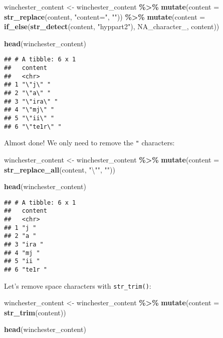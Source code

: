 \documentclass[
]{article}
\newenvironment{Shaded}{\begin{snugshade}}{\end{snugshade}}
\newcommand{\CharTok}[1]{\textcolor[rgb]{0.31,0.60,0.02}{#1}}
\newcommand{\DataTypeTok}[1]{\textcolor[rgb]{0.13,0.29,0.53}{#1}}
\newcommand{\KeywordTok}[1]{\textcolor[rgb]{0.13,0.29,0.53}{\textbf{#1}}}
\newcommand{\NormalTok}[1]{#1}
\newcommand{\OperatorTok}[1]{\textcolor[rgb]{0.81,0.36,0.00}{\textbf{#1}}}
\newcommand{\OtherTok}[1]{\textcolor[rgb]{0.56,0.35,0.01}{#1}}
\newcommand{\StringTok}[1]{\textcolor[rgb]{0.31,0.60,0.02}{#1}}
\begin{document}
\begin{Shaded}
\begin{Highlighting}[]
\NormalTok{winchester\_content \textless{}{-}}\StringTok{ }\NormalTok{winchester\_content }\OperatorTok{\%\textgreater{}\%}\StringTok{ }
\StringTok{  }\KeywordTok{mutate}\NormalTok{(}\DataTypeTok{content =} \KeywordTok{str\_replace}\NormalTok{(content, }\StringTok{"content="}\NormalTok{, }\StringTok{""}\NormalTok{)) }\OperatorTok{\%\textgreater{}\%}\StringTok{ }
\StringTok{  }\KeywordTok{mutate}\NormalTok{(}\DataTypeTok{content =} \KeywordTok{if\_else}\NormalTok{(}\KeywordTok{str\_detect}\NormalTok{(content, }\StringTok{"hyppart2"}\NormalTok{), }\OtherTok{NA\_character\_}\NormalTok{, content))}

\KeywordTok{head}\NormalTok{(winchester\_content)}
\end{Highlighting}
\end{Shaded}

\begin{verbatim}
## # A tibble: 6 x 1
##   content    
##   <chr>      
## 1 "\"j\" "   
## 2 "\"a\" "   
## 3 "\"ira\" " 
## 4 "\"mj\" "  
## 5 "\"ii\" "  
## 6 "\"te1r\" "
\end{verbatim}

Almost done! We only need to remove the \texttt{"} characters:

\begin{Shaded}
\begin{Highlighting}[]
\NormalTok{winchester\_content \textless{}{-}}\StringTok{ }\NormalTok{winchester\_content }\OperatorTok{\%\textgreater{}\%}\StringTok{ }
\StringTok{  }\KeywordTok{mutate}\NormalTok{(}\DataTypeTok{content =} \KeywordTok{str\_replace\_all}\NormalTok{(content, }\StringTok{"}\CharTok{\textbackslash{}"}\StringTok{"}\NormalTok{, }\StringTok{""}\NormalTok{)) }

\KeywordTok{head}\NormalTok{(winchester\_content)}
\end{Highlighting}
\end{Shaded}

\begin{verbatim}
## # A tibble: 6 x 1
##   content
##   <chr>  
## 1 "j "   
## 2 "a "   
## 3 "ira " 
## 4 "mj "  
## 5 "ii "  
## 6 "te1r "
\end{verbatim}

Let's remove space characters with \texttt{str\_trim()}:

\begin{Shaded}
\begin{Highlighting}[]
\NormalTok{winchester\_content \textless{}{-}}\StringTok{ }\NormalTok{winchester\_content }\OperatorTok{\%\textgreater{}\%}\StringTok{ }
\StringTok{  }\KeywordTok{mutate}\NormalTok{(}\DataTypeTok{content =} \KeywordTok{str\_trim}\NormalTok{(content)) }

\KeywordTok{head}\NormalTok{(winchester\_content)}
\end{Highlighting}
\end{Shaded}
\end{document}

